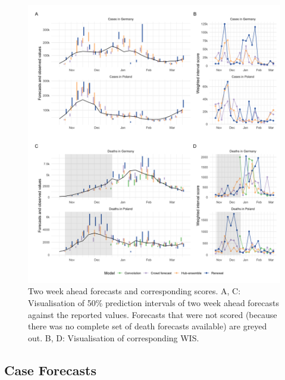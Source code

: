 \documentclass[10pt,letterpaper]{article}
\begin{document}
\begin{figure}[H]
\includegraphics[width=1\linewidth,]{../analysis/plots/figure-forecasts-2} \caption{Two week ahead forecasts and corresponding scores. A, C: Visualisation of 50\% prediction intervals of two week ahead forecasts against the reported values. Forecasts that were not scored (because there was no complete set of death forecasts available) are greyed out. B, D: Visualisation of corresponding WIS.}\label{fig:forecasts-and-truth}
\end{figure}

\hypertarget{case-forecasts}{%
\subsection{Case Forecasts}\label{case-forecasts}}
\end{document}
